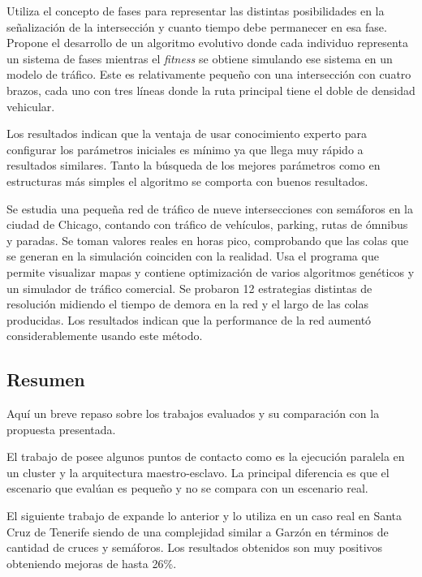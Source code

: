 \begin{itemize}
\begin{item}
Utiliza el concepto de fases para representar las distintas posibilidades en la señalización de la intersección y cuanto tiempo debe permanecer en esa fase. 
Propone el desarrollo de un algoritmo evolutivo donde cada individuo representa un sistema de fases mientras el \emph{fitness} se obtiene simulando ese sistema en un modelo de tráfico. Este es relativamente pequeño con una intersección con cuatro brazos, cada uno con tres líneas donde la ruta principal tiene el doble de densidad vehicular. 

Los resultados indican que la ventaja de usar conocimiento experto para configurar los parámetros iniciales es mínimo ya que llega muy rápido a resultados similares. Tanto la búsqueda de los mejores parámetros como en estructuras más simples el algoritmo se comporta con buenos resultados.

\end{item}	

\begin{item}

Se estudia una pequeña red de tráfico de nueve intersecciones con semáforos en la ciudad de Chicago, contando con tráfico de vehículos, parking, rutas de ómnibus y paradas.  
Se toman valores reales en horas pico, comprobando que las colas que se generan en la simulación coinciden con la realidad.
Usa el programa \citet{TRANSYT-7F} que permite visualizar mapas y contiene optimización de varios algoritmos genéticos y \citet{CORSIM}  un simulador de tráfico comercial.
Se probaron 12 estrategias distintas de resolución midiendo el tiempo de demora en la red y el largo de las colas producidas. Los resultados indican que la performance de la red aumentó considerablemente usando este método.	
\end{item}	
	
\end{itemize}


\subsection{Resumen}
Aquí un breve repaso sobre los trabajos evaluados y su comparación con la propuesta presentada.

El trabajo de \citet{Sanchez2004} posee algunos puntos de contacto como es la ejecución paralela en un cluster y la arquitectura maestro-esclavo. La principal diferencia es que el escenario que evalúan es pequeño y no se compara con un escenario real.

El siguiente trabajo de \citet{Sanchez2008} expande lo anterior y lo utiliza en un caso real en Santa Cruz de Tenerife siendo de una complejidad similar a Garzón en términos de cantidad de cruces y semáforos. Los resultados obtenidos son muy positivos obteniendo mejoras de hasta 26\%.

